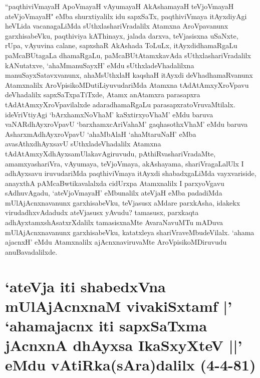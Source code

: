\begin{artha}
``paqthiviVmayaH ApoVmayaH vAyumayaH AkAshamayaH teVjoVmayaH ateVjoVmayaH" eMba shurxtiyalilx idu sapxSaTx, paqthiviVmaya itAyxdiyAgi heVLida vacanagaLiMda sUthxlashariVradalilx Atamxna AroVpavanunx garxhisabeVku, paqthiviya kAThinayx, jalada darxva, teVjasisxna uSaNxte, rUpa, vAyuvina calane, sapxshaR AkAshada ToLuLx, itAyxdidhamaRgaLu paMcaBUtagaLa dhamaRgaLu, paMcaBUtAtamxkavAda sUthxlashariVradalilx kANutatxve, `ahaMmanuSayxH' eMdu sUthxladeVhadalilxna manuSayxSatavxvanunx, ahaMsUthxlaH kaqshaH itAyxdi deVhadhamaRvanunx Atamxnalilx AroVpisikoMDutiLiyuvudariMda Atamxna tAdAtAmxyXroVpavu deVhadalilx sapxSaTxpaTiTxde, Atamx anAtamxra parasapxra tAdAtAmxyXroVpavilalxde adaradhamaRgaLu parasapxratoVruvaMtilalx. ideVriVtiyAgi `bArxhamxNoVhaM' kaSxtirxyoVhaM' eMdu baruva vaNARdhAyxroVpavU `barxhamxcAriVahaM' gaqhasothxV\s haM' eMdu baruva AsharxmAdhAyxroVpavU `ahaMbAlaH `ahaMtaruNaH' eMba avasAthxdhAyxsavU sUthxladeVhadalilx Atamxna tAdAtAmxyXdhAyxsamUlakavAgiruvudu, pAthiRvashariVradaMte, amamxyashariVra, vAyumaya,  teVjoVmaya, akAshayama, shariVragaLalUlx I adhAyxsavu iruvudariMda paqthiviVmaya itAyxdi shabadxgaLiMda vayxvariside, anayxthA pAMcaBwtikavalalxda cidUrxpa Atamxnalilx I parxyoVgavu sAdhuvAgadu, `ateVjoVmayaH' eMbunalilx ateVjaH eMba padadiMda mUlAjAcnxnavanunx garxhisabeVku, teVjasusx aMdare parxkAsha, idakekx virudadhxvAdadudx ateVjasusx yAvudu? tamasusx, parxkaqta adhAyxtamxshAsatxrXdalilx tamasisxnaMte AvaraNavuMTu mADuva mUlAjAcnxnavanunx garxhisabeVku, katatxleya shariVraveMbudeVilalx. `ahama ajacnxH' eMdu Atamxnalilx ajAcnxnaviruvaMte AroVpisikoMDiruvudu anuBavadalilxde.
\end{artha}

\section*{`ateVja iti shabedxVna mUlAjAcnxnaM vivakiSxtamf |' `ahamajacnx iti sapxSaTxma jAcnxnA dhAyxsa IkaSxyXteV ||' eMdu vAtiRka(sAra)dalilx (4-4-81)}



